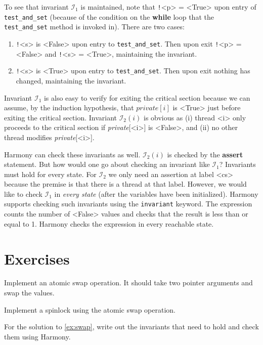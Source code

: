 \documentclass{report}
\begin{document}
To see that invariant $\mathcal{I}_1$ is maintained, note that
\texttt{!}<{p}> = <{True}> upon entry of \texttt{test\_and\_set}
(because of the condition on the \textbf{while} loop that the
\texttt{test\_and\_set} method is invoked in).
There are two cases:
\begin{enumerate}
\item \texttt{!}<{s}> is <{False}> upon entry to \texttt{test\_and\_set}.
Then upon exit \texttt{!}<{p}> = <{False}> and \texttt{!}<{s}> = <{True}>,
maintaining the invariant.
\item \texttt{!}<{s}> is <{True}> upon entry to \texttt{test\_and\_set}.
Then upon exit nothing has changed, maintaining the invariant.
\end{enumerate}
Invariant $\mathcal{I}_1$ is also easy to verify for exiting the critical section
because we can assume, by the induction hypothesis, that $\textit{private}[i]$ is
<{True}> just before exiting the critical section.
Invariant $\mathcal{I}_2(i)$ is obvious as (i) thread <{i}> only proceeds to the critical
section if \textit{private}[<{i}>] is <{False}>, and (ii) no other thread modifies
\textit{private}[<{i}>].

Harmony can check these invariants as well.
$\mathcal{I}_2(i)$ is checked by the \textbf{assert} statement.
But how would one go about checking an
invariant like $\mathcal{I}_1$?  Invariants must hold for every state.
For $\mathcal{I}_2$ we only need an assertion at label <{cs}> because the
premise is that there is a thread at that label.  However, we would
like to check $\mathcal{I}_1$ in \emph{every state} (after the variables have
been initialized).
Harmony supports checking such invariants using the \texttt{invariant}
keyword.
The expression counts the number of <{False}> values and checks that
the result is less than or equal to 1.
Harmony checks the expression in every reachable state.

\section*{Exercises}
\begin{problems}
\item Implement an atomic swap operation.  It should take two pointer arguments
and swap the values.
\item \label{ex:swap} Implement a spinlock using the atomic swap operation.
\item For the solution to \autoref{ex:swap},
write out the invariants that need to hold and check them using Harmony.
\end{problems}
\end{document}
